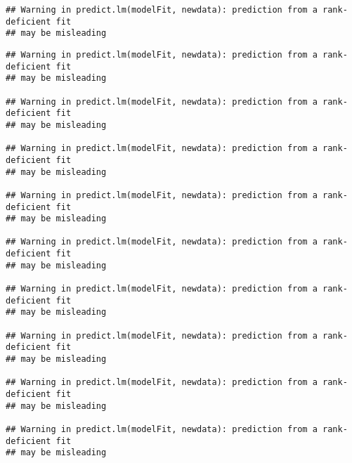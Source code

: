 \documentclass[
]{article}
\newenvironment{Shaded}{\begin{snugshade}}{\end{snugshade}}
\newcommand{\CommentTok}[1]{\textcolor[rgb]{0.56,0.35,0.01}{\textit{#1}}}
\newcommand{\DataTypeTok}[1]{\textcolor[rgb]{0.13,0.29,0.53}{#1}}
\newcommand{\DecValTok}[1]{\textcolor[rgb]{0.00,0.00,0.81}{#1}}
\newcommand{\FloatTok}[1]{\textcolor[rgb]{0.00,0.00,0.81}{#1}}
\newcommand{\KeywordTok}[1]{\textcolor[rgb]{0.13,0.29,0.53}{\textbf{#1}}}
\newcommand{\NormalTok}[1]{#1}
\newcommand{\OperatorTok}[1]{\textcolor[rgb]{0.81,0.36,0.00}{\textbf{#1}}}
\newcommand{\OtherTok}[1]{\textcolor[rgb]{0.56,0.35,0.01}{#1}}
\newcommand{\StringTok}[1]{\textcolor[rgb]{0.31,0.60,0.02}{#1}}
\begin{document}
\begin{Shaded}
\end{Shaded}

\begin{verbatim}
## Warning in predict.lm(modelFit, newdata): prediction from a rank-deficient fit
## may be misleading
\end{verbatim}

\begin{verbatim}
## Warning in predict.lm(modelFit, newdata): prediction from a rank-deficient fit
## may be misleading

## Warning in predict.lm(modelFit, newdata): prediction from a rank-deficient fit
## may be misleading

## Warning in predict.lm(modelFit, newdata): prediction from a rank-deficient fit
## may be misleading

## Warning in predict.lm(modelFit, newdata): prediction from a rank-deficient fit
## may be misleading

## Warning in predict.lm(modelFit, newdata): prediction from a rank-deficient fit
## may be misleading

## Warning in predict.lm(modelFit, newdata): prediction from a rank-deficient fit
## may be misleading

## Warning in predict.lm(modelFit, newdata): prediction from a rank-deficient fit
## may be misleading

## Warning in predict.lm(modelFit, newdata): prediction from a rank-deficient fit
## may be misleading

## Warning in predict.lm(modelFit, newdata): prediction from a rank-deficient fit
## may be misleading
\end{verbatim}
\end{document}
